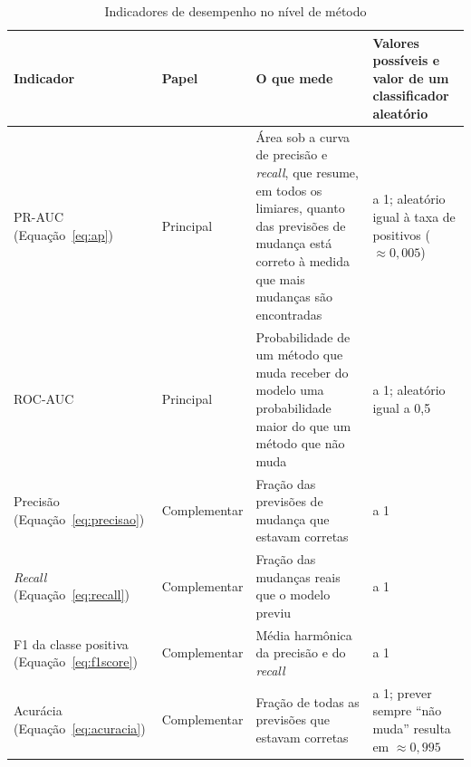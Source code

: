 \begin{table}[htbp]
    \centering
    \footnotesize
    \renewcommand{\arraystretch}{1.2}
    \caption{Indicadores de desempenho no nível de método}
    \label{tab:met-indicadores}
    \begin{tabularx}{\linewidth}{@{}>{\raggedright\arraybackslash}p{2.6cm}>{\raggedright\arraybackslash}p{1.9cm}>{\raggedright\arraybackslash}X>{\raggedright\arraybackslash}p{3.3cm}@{}}
        \toprule
        Indicador & Papel & O que mede & Valores possíveis e valor de um classificador aleatório \\
        \midrule
        PR-AUC (Equação~\ref{eq:ap}) & Principal & Área sob a curva de precisão e \textit{recall}, que resume, em todos os limiares, quanto das previsões de mudança está correto à medida que mais mudanças são encontradas & 0 a 1; aleatório igual à taxa de positivos ($\approx 0{,}005$) \\
        ROC-AUC & Principal & Probabilidade de um método que muda receber do modelo uma probabilidade maior do que um método que não muda & 0 a 1; aleatório igual a 0,5 \\
        \midrule
        Precisão (Equação~\ref{eq:precisao}) & Complementar & Fração das previsões de mudança que estavam corretas & 0 a 1 \\
        \textit{Recall} (Equação~\ref{eq:recall}) & Complementar & Fração das mudanças reais que o modelo previu & 0 a 1 \\
        F1 da classe positiva (Equação~\ref{eq:f1score}) & Complementar & Média harmônica da precisão e do \textit{recall} & 0 a 1 \\
        Acurácia (Equação~\ref{eq:acuracia}) & Complementar & Fração de todas as previsões que estavam corretas & 0 a 1; prever sempre ``não muda'' resulta em $\approx 0{,}995$ \\
        \bottomrule
    \end{tabularx}
\end{table}%
